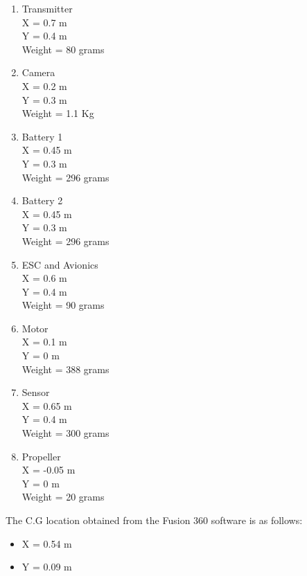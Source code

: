 \documentclass[12 pt]{article}
\begin{document}
{{\begin{itemize}
   \end{itemize}
 \begin{enumerate}

     \item Transmitter \\
       X = 0.7 m \\
       Y = 0.4 m \\
       Weight = 80 grams
     \item Camera \\
      X = 0.2 m \\
      Y =  0.3 m \\
      Weight = 1.1 Kg 
     \item Battery 1 \\
       X = 0.45 m \\
       Y = 0.3 m \\
       Weight = 296 grams 
     \item Battery 2 \\
       X = 0.45 m \\
       Y = 0.3 m \\
       Weight = 296 grams 
     \item ESC and Avionics \\
      X = 0.6 m \\
      Y = 0.4 m \\
      Weight = 90 grams 
     \item Motor \\
       X = 0.1 m \\
       Y = 0 m \\
       Weight = 388 grams 
     \item Sensor \\
       X = 0.65 m \\
       Y = 0.4 m \\
       Weight = 300 grams 
       \item Propeller \\
       X = -0.05 m \\
       Y = 0 m \\
       Weight = 20 grams 
 \end{enumerate}

The C.G location obtained from the Fusion 360 software is as follows:
\begin{itemize}
    \item X = 0.54 m 
    \item Y = 0.09 m 
\end{itemize}

\clearpage

}}
\end{document}
